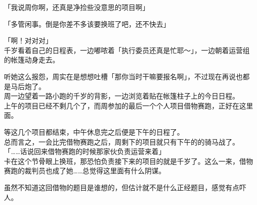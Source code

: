 「我说周你啊，还真是净捡些没意思的项目啊」

「多管闲事。倒是你差不多该要换班了吧，还不快去」

「啊！对对对」\\

千岁看着自己的日程表，一边嘟哝着「执行委员还真是忙耶～」，一边朝着运营组的帐篷动身走去。

听她这么报怨，周实在是想想吐槽「那你当时干嘛要报名啊」，不过现在再说也都是马后炮了。\\

周一边望着一路小跑的千岁的背影，一边浏览着贴在帐篷柱子上的今日日程。\\

上午的项目已经不剩几个了，而周参加的最后一个个人项目借物赛跑，正好在这里面。

等这几个项目都结束，中午休息完之后便是下午的日程了。\\

总而言之，一会比完借物赛跑之后，周剩下的项目就只有下午的的骑马战了。\\

「……话说回来借物赛跑的时候那家伙负责运营来着」\\

卡在这个节骨眼上换班，那恐怕负责接下来的项目的就是千岁了。这么一来，借物赛跑的裁判员也成了她……总觉得这里面有什么阴谋。

虽然不知道这回借物的题目是谁想的，但估计就不是什么正经题目，感觉有点吓人。

